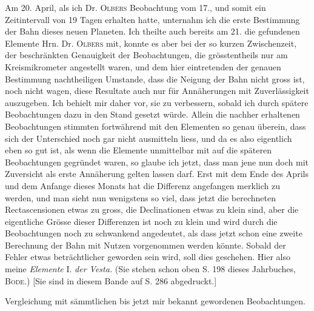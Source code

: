 \par\indent Am 20. April, als ich Dr. \textsc{Olbers} Beobachtung vom 17., und somit ein Zeitintervall von 19 Tagen
erhalten hatte, unternahm ich die erste Bestimmung der Bahn dieses neuen Planeten. Ich theilte
auch bereits am 21. die gefundenen Elemente Hrn. Dr. \textsc{Olbers} mit, konnte es aber bei der so kurzen
Zwischenzeit, der beschränkten Genauigkeit der Beobachtungen, die grösstentheils nur am Kreismikrometer angestellt waren, und dem hier eintretenden der genauen Bestimmung nachtheiligen
Umstande, dass die Neigung der Bahn nicht gross ist, noch nicht wagen, diese Resultate auch nur
für Annäherungen mit Zuverlässigkeit auszugeben. Ich behielt mir daher vor, sie zu verbessern,
sobald ich durch spätere Beobachtungen dazu in den Stand gesetzt würde. Allein die nachher
erhaltenen Beobachtungen stimmten fortwährend mit den Elementen so genau überein, dass sich der
Unterschied noch gar nicht ausmitteln liess, und da es also eigentlich eben so gut ist, als wenn die
Elemente unmittelbar mit auf die späteren Beobachtungen gegründet waren, so glaube ich jetzt, dass
man jene nun doch mit Zuversicht als erste Annäherung gelten lassen darf. Erst mit dem Ende des
Aprils und dem Anfange dieses Monats hat die Differenz angefangen merklich zu werden, und man
sieht nun wenigstens so viel, dass jetzt die berechneten Rectascensionen etwas zu gross, die Declinationen etwas zu klein sind, aber die eigentliche Grösse dieser Differenzen ist noch zu klein und
wird durch die Beobachtungen noch zu schwankend angedeutet, als dass jetzt schon eine zweite
Berechnung der Bahn mit Nutzen vorgenommen werden könnte. Sobald der Fehler etwas beträchtlicher geworden sein wird, soll dies geschehen. Hier also meine \emph{Elemente} I. \emph{der Vesta.} (Sie stehen
schon oben S. 198 dieses Jahrbuches, \textsc{Bode}.) [Sie sind in diesem Bande auf S. 286 abgedruckt.]
%
\par\medskip\noindent Vergleichung mit sämmtlichen bis jetzt mir bekannt gewordenen Beobachtungen.

